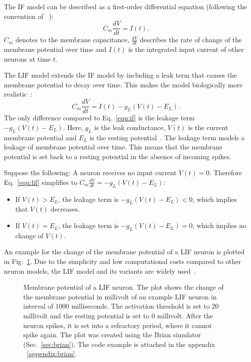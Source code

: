 The \ac{IF} model can be described as a first-order differential equation (following the convention of ~\cite{pietrzak_overview_2023}):
\begin{equation}
    C_m\frac{dV}{dt}=I(t).
    \label{equ:if}
\end{equation}
\(C_m\) denotes to the membrane capacitance, \(\frac{dV}{dt}\) describes the rate of change of the membrane potential over time and \(I(t)\) is the integrated input current of other neurons at time \(t\).

The \ac{LIF} model extends the \ac{IF} model by including a leak term that causes the membrane potential to decay over time.
This makes the model biologically more realistic~\cite{pietrzak_overview_2023, nunes_spiking_2022}:
\begin{equation}
    C_m\frac{dV}{dt}=I(t)-g_L(V(t)-E_L).
    \label{equ:lif}
\end{equation}
The only difference compared to Eq.~\ref{equ:if} is the leakage term \(-g_L(V(t)-E_L)\).
Here, \(g_L\) is the leak conductance, \(V(t)\) is the current membrane potential and \(E_L\) is the resting potential~\cite{pietrzak_overview_2023}.
The leakage term models a leakage of membrane potential over time.
This means that the membrane potential is set back to a resting potential in the absence of incoming spikes.

Suppose the following: 
A neuron receives no input current \(V(t)=0\).
Therefore Eq.~\ref{equ:lif} simplifies to \(C_m\frac{dV}{dt}=-g_L(V(t)-E_L)\):
\begin{itemize}
    \item If \(V(t) > E_L\), the leakage term is \(-g_L(V(t)-E_L) < 0\), which implies that \(V(t)\) decreases.
    \item If \(V(t) = E_L\), the leakage term is \(-g_L(V(t)-E_L) = 0\), which implies no change of \(V(t)\).
\end{itemize}
An example for the change of the membrane potential of a \ac{LIF} neuron is plotted in Fig.~\ref{fig:membranepotentiallif}.
Due to the simplicity and low computational costs compared to other neuron models, the \ac{LIF} model and its variants are widely used~\cite{yamazaki_spiking_2022}.

\begin{figure} 
    \centering
    
    \caption[Membrane potential of a \ac{LIF} neuron]{Membrane potential of a \ac{LIF} neuron. The plot shows the change of the membrane potential in millivolt of an example \ac{LIF} neuron in interval of 1000 milliseconds.
    The activation threshold is set to 20 millivolt and the resting potential is set to 0 millivolt.
    After the neuron spikes, it is set into a refractory period, where it cannot spike again.
    The plot was created using the Brian simulator (Sec.~\ref{sec:brian}).
    The code example is attached in the appendix ~\ref{appendix:brian}.}
    \label{fig:membranepotentiallif}
\end{figure}

